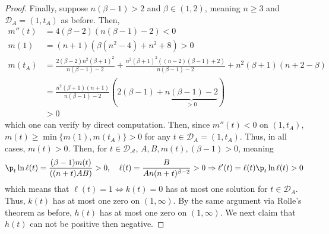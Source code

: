 \documentclass[11pt]{article}
\begin{document}
\begin{proof}
Finally, suppose $n(\beta-1)>2$ and $\beta \in (1,2)$, meaning $n\geq 3$ and $\mathcal{D}_A=(1,t_A)$ as before. Then,
\begin{align*}
    m''(t)&=4(\beta-2)(n(\beta-1)-2)<0\\
    m(1)&=(n+1)(\beta(n^2-4)+n^2+8)>0\\
    m(t_A)&=\frac{2(\beta-2)n^2(\beta+1)^2}{n(\beta-1)-2}+\frac{n^2(\beta+1)^2((n-2)(\beta-1)+2)}{n(\beta-1)-2}+n^2(\beta+1)(n+2-\beta)\\
    &=\frac{n^2(\beta+1)(n+1)}{n(\beta-1)-2}(2(\beta-1)+\underbrace{n(\beta-1)-2}_{>0})\\
    &>0
\end{align*}
which one can verify by direct computation.
Then, since $m''(t)<0$ on $(1,t_A)$, $m(t)\geq \min\{m(1),m(t_A)\}>0$ for any $t \in \mathcal{D}_A=(1,t_A)$. Thus, in all cases, $m(t)>0$. Then, for $t\in \mathcal{D_A}$, $A,B,m(t),(\beta-1)>0$, meaning 
$$\p_t \ln \ell(t)=\frac{(\beta-1)m(t)}{((n+t)AB)}>0,\quad \ell(t)=\frac{B}{An(n+t)^{\beta-2}}>0\Rightarrow \ell'(t)=\ell(t)\p_t\ln \ell(t)>0$$ 
which means that $\ell(t)=1\Leftrightarrow k(t)=0$ has at most one solution for $t\in \mathcal{D}_A$. Thus, $k(t)$ has at most one zero on $(1,\infty)$. By the same argument via Rolle's theorem as before, $h(t)$ has at most one zero on $(1,\infty)$. We next claim that $h(t)$ can not be positive then negative. 


\end{proof}
\end{document}
